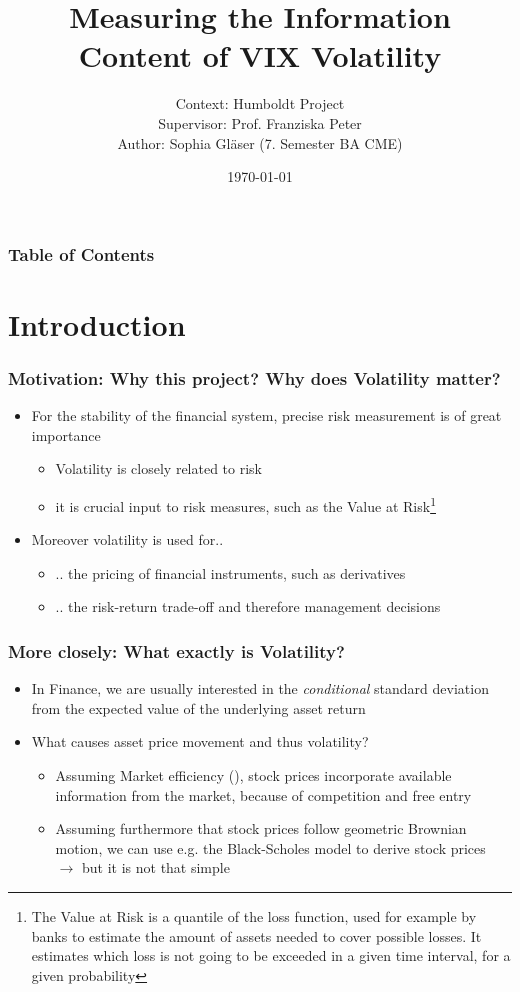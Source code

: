 \documentclass[aspectratio=169]{beamer}
\title{Measuring the Information Content of VIX Volatility}
\author{Context: Humboldt Project\\
Supervisor: Prof. Franziska Peter\\
Author: Sophia Gläser (7. Semester BA CME)}
\date{\small \today}
\begin{document}
\begin{frame}
\maketitle
\end{frame}

\begin{frame}
\frametitle{Table of Contents}
\tableofcontents
\end{frame}

\section{Introduction}

\begin{frame}
\frametitle{Motivation: Why this project? Why does Volatility matter?}
	\begin{itemize}
	\item<1-> For the stability of the financial system, precise risk measurement is of great importance
	\begin{itemize}
	\item<1-> Volatility is closely related to risk 
	\item<1-> it is crucial input to risk measures, such as the Value at Risk\footnote{The Value at Risk is a quantile of the loss function, used for example by banks to estimate the amount of assets needed to cover possible losses. It estimates which loss is not going to be exceeded in a given time interval, for a given probability}
	\end{itemize}
	\item<2-> Moreover volatility is used for..
	\begin{itemize}
	\item<2-> .. the pricing of financial instruments, such as derivatives
	\item<2-> .. the risk-return trade-off and therefore management decisions
	\end{itemize}
	\end{itemize}
\end{frame}

\begin{frame}
\frametitle{More closely: What exactly is Volatility?}
	\begin{itemize}
	\item<1-> In Finance, we are usually interested in the \textit{conditional} standard deviation from the expected value of the underlying asset return \parencite{tsay2005}
	\item<1-> What causes asset price movement and thus volatility?
	\begin{itemize}
	\item<2-> Assuming Market efficiency (\citeauthor{fama1970}), stock prices incorporate available information from the market, because of competition and free entry 
	\item<2-> Assuming furthermore that stock prices follow geometric Brownian motion, we can use e.g. the Black-Scholes model to derive stock prices $\rightarrow$ but it is not that simple
	\end{itemize}
	\end{itemize}
\end{frame}
\end{document}

